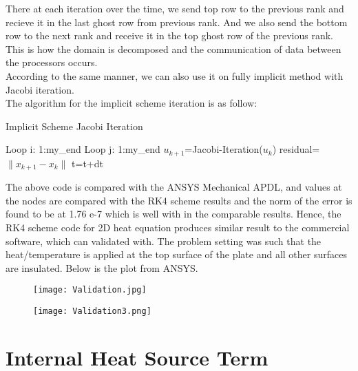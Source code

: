 \documentclass[10pt,a4paper]{report}
\begin{document}
There at each iteration over the time, we send top row to the previous rank and recieve it in the last ghost row from previous rank. And we also send the bottom row to the next rank and receive it in the top ghost row of the previous rank. This is how the domain is decomposed and the communication of data between the processors occurs.\\
According to the same manner, we can also use it on fully implicit method with Jacobi iteration.\\
The algorithm for the implicit scheme iteration is as follow:

\begin{algorithm}[h]
  \caption{Implicit Scheme Jacobi Iteration}
  \KwIn{}
  \KwOut{}
  
  {
    
    {
	Loop i: 1:my\_end\;	
    \Indp Loop j: 1:my\_end\;
      	\Indp $u_{k+1}$=Jacobi-Iteration($u_{k}$)\;
    \Indm \Indm residual=$\parallel x_{k+1}-x_{k} \parallel$  
    }
    t=t+dt
  }
\end{algorithm}
\pagebreak

The above code is compared with the ANSYS Mechanical APDL, and values at the nodes are compared with the RK4 scheme results and the norm of the error is found to be at 1.76 e-7 which is well with in the comparable results. Hence, the RK4 scheme code for 2D heat equation produces similar result to the commercial software, which can validated with. The problem setting was such that the heat/temperature is applied at the top surface of the plate and all other surfaces are insulated. Below is the plot from ANSYS.\\

\begin{figure}
\begin{minipage}[t]{0.5\linewidth}
\centering
\texttt{[image: Validation.jpg]}
\caption{}
\label{fig:side:a}
\end{minipage}%
\begin{minipage}[t]{0.5\linewidth}
\centering
\texttt{[image: Validation3.png]}
\caption{}
\label{fig:side:b}
\end{minipage}
\end{figure}





\section{Internal Heat Source Term}
\end{document}
